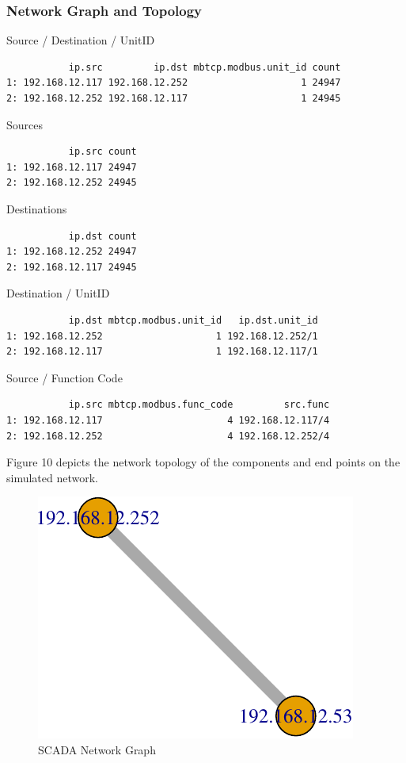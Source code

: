 \documentclass[12pt,]{article}
\begin{document}
\subsubsection{Network Graph and
Topology}\label{network-graph-and-topology}

Source / Destination / UnitID

\begin{verbatim}
           ip.src         ip.dst mbtcp.modbus.unit_id count
1: 192.168.12.117 192.168.12.252                    1 24947
2: 192.168.12.252 192.168.12.117                    1 24945
\end{verbatim}

Sources

\begin{verbatim}
           ip.src count
1: 192.168.12.117 24947
2: 192.168.12.252 24945
\end{verbatim}

Destinations

\begin{verbatim}
           ip.dst count
1: 192.168.12.252 24947
2: 192.168.12.117 24945
\end{verbatim}

Destination / UnitID

\begin{verbatim}
           ip.dst mbtcp.modbus.unit_id   ip.dst.unit_id
1: 192.168.12.252                    1 192.168.12.252/1
2: 192.168.12.117                    1 192.168.12.117/1
\end{verbatim}

Source / Function Code

\begin{verbatim}
           ip.src mbtcp.modbus.func_code         src.func
1: 192.168.12.117                      4 192.168.12.117/4
2: 192.168.12.252                      4 192.168.12.252/4
\end{verbatim}

\clearpage

Figure 10 depicts the network topology of the components and end points
on the simulated network.

\begin{figure}

{\centering \includegraphics{thesis_files/figure-latex/warning-1} 

}

\caption{SCADA Network Graph}\label{fig:warning}
\end{figure}
\end{document}
